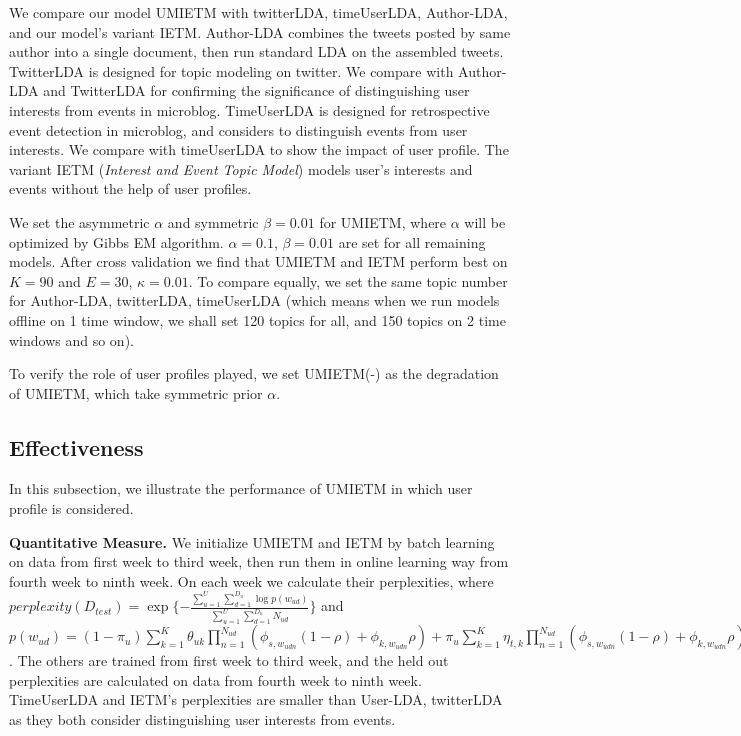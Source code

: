 \documentclass[runningheads,a4paper]{llncs}
\begin{document}
We compare our model UMIETM with twitterLDA\cite{zhao2011twitterLDA}, timeUserLDA\cite{timeUserLDA2012finding}, Author-LDA, and our model's variant IETM.
Author-LDA combines the tweets posted by same author into a single document, then run standard LDA on the assembled tweets.
TwitterLDA is designed for topic modeling on twitter.
We compare with Author-LDA and TwitterLDA for confirming the significance of distinguishing user interests from events in microblog.
TimeUserLDA\cite{timeUserLDA2012finding} is designed for retrospective event detection in microblog, and considers to distinguish events from user interests.
We compare with timeUserLDA to show the impact of user profile.
The variant IETM (\textit{Interest and Event Topic Model}) models user's interests and events without the help of user profiles.

We set the asymmetric \(\alpha\) and symmetric \(\beta=0.01\) for UMIETM, where \(\alpha\) will be optimized by Gibbs EM algorithm\cite{wallach2008structured}.
\(\alpha=0.1\), \(\beta=0.01\) are set for all remaining models. 
After cross validation we find that UMIETM and IETM perform best on \(K=90\) and \(E=30\), \(\kappa=0.01\).
To compare equally, we set the same topic number for Author-LDA, twitterLDA, timeUserLDA (which means when we run models offline on 1 time window, we shall set 120 topics for all, and 150 topics on 2 time windows and so on).

To verify the role of user profiles played, we set UMIETM(-) as the degradation of UMIETM, which take symmetric prior \(\alpha\).

\subsection{Effectiveness}
In this subsection, we illustrate the performance of UMIETM in which user profile is considered.

\textbf{Quantitative Measure.}
We initialize UMIETM and IETM by batch learning on data from first week to third week, then run them in online learning way from fourth week to ninth week.
On each week we calculate their perplexities\cite{wallach2009evaluation}, where \(perplexity(D_{test})=\exp{\{-\frac{\sum_{u=1}^{U}\sum_{d=1}^{D_u}\log{p(w_{ud})}}{\sum_{u=1}^{U}\sum_{d=1}^{D_u}N_{ud}}\}}\) and \(p(w_{ud})=(1-\pi_u)\sum_{k=1}^{K}\theta_{uk}\prod_{n=1}^{N_{ud}}(\phi_{s,w_{udn}}(1-\rho)+\phi_{k,w_{udn}}\rho)+\pi_u \sum_{k=1}^{K}\eta_{t,k}\prod_{n=1}^{N_{ud}}(\phi_{s,w_{udn}}(1-\rho)+\phi_{k,w_{udn}}\rho)\).
The others are trained from first week to third week, and the held out perplexities are calculated on data from fourth week to ninth week.
TimeUserLDA and IETM's perplexities are smaller than User-LDA, twitterLDA as they both consider distinguishing user interests from events.
\end{document}
